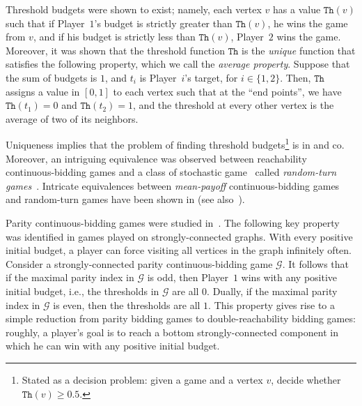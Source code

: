 \documentclass{theoretics}
\newcommand{\PO}{Player~$1$\xspace}
\newcommand{\PT}{Player~$2$\xspace}
\newcommand{\PLi}{Player~$i$\xspace}
\newcommand{\G}{{\mathcal G}}
\newcommand{\thresh}{\texttt{Th}\xspace}
\renewcommand{\set}[1]{\{ #1  \}}
\begin{document}
Threshold budgets were shown to exist; namely, each vertex $v$ has a value $\thresh(v)$ such that if \PO's budget is strictly greater than $\thresh(v)$, he wins the game from $v$, and if his budget is strictly less than $\thresh(v)$, \PT wins the game. Moreover, it was shown that the threshold function $\thresh$ is the {\em unique} function that satisfies the following property, which we call the {\em average property}. Suppose that the sum of budgets is $1$, and $t_i$ is \PLi's target, for $i \in \set{1,2}$. Then, $\thresh$ assigns a value in $[0,1]$ to each vertex such that at the ``end points'', we have $\thresh(t_1) = 0$ and $\thresh(t_2) = 1$, and the threshold at every other vertex is the average of two of its neighbors. 

Uniqueness implies that the problem of finding threshold budgets\footnote{Stated as a decision problem: given a game and a vertex $v$, decide whether $\thresh(v) \geq 0.5$.} is in \NP and co\NP. Moreover, an intriguing equivalence was observed between reachability continuous-bidding  games and a class of stochastic game~\cite{Con92} called {\em random-turn games}~\cite{PSSW09}. Intricate equivalences between {\em mean-payoff} continuous-bidding games and random-turn games have been shown in \cite{AHC19,AHI18,AHZ21,AJZ21} (see also~\cite{AH20}). 

Parity continuous-bidding games were studied in~\cite{AHC19}. The following key property was identified in games played on strongly-connected graphs. With every positive initial budget, a player can force visiting all vertices in the graph infinitely often. Consider a strongly-connected parity continuous-bidding game $\G$. It follows that if the maximal parity index in $\G$ is odd, then \PO wins with any positive initial budget, i.e., the thresholds in $\G$ are all $0$. Dually, if the maximal parity index in $\G$ is even, then the thresholds are all $1$. This property gives rise to a simple reduction from parity bidding games to double-reachability bidding  games: roughly, a player's goal is to reach a bottom strongly-connected component in which he can win with any positive initial budget. 
\end{document}
